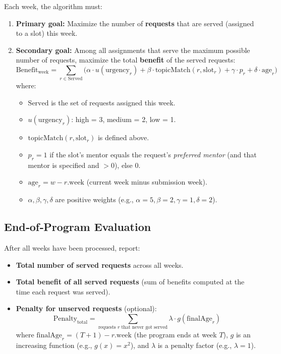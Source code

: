 \documentclass[12pt]{article}
\begin{document}
Each week, the algorithm must:

\begin{enumerate}
\item \textbf{Primary goal:} Maximize the number of \textbf{requests} that are served (assigned to a slot) this week.
\item \textbf{Secondary goal:} Among all assignments that serve the maximum possible number of requests, maximize the total \textbf{benefit} of the served requests:
\[
\text{Benefit}_{\text{week}} = \sum_{r \in \text{Served}} \Big( \alpha \cdot u(\text{urgency}_r) + \beta \cdot \text{topicMatch}(r, \text{slot}_r) + \gamma \cdot p_r + \delta \cdot \text{age}_r \Big)
\]
where:
\begin{itemize}
\item $\text{Served}$ is the set of requests assigned this week.
\item $u(\text{urgency}_r)$: high = 3, medium = 2, low = 1.
\item $\text{topicMatch}(r, \text{slot}_r)$ is defined above.
\item $p_r = 1$ if the slot’s mentor equals the request’s \textit{preferred mentor} (and that mentor is specified and $>0$), else 0.
\item $\text{age}_r = w - r.\text{week}$ (current week minus submission week).
\item $\alpha, \beta, \gamma, \delta$ are positive weights (e.g., $\alpha=5, \beta=2, \gamma=1, \delta=2$).
\end{itemize}
\end{enumerate}

\subsection*{End‑of‑Program Evaluation}

After all weeks have been processed, report:

\begin{itemize}
\item \textbf{Total number of served requests} across all weeks.
\item \textbf{Total benefit of all served requests} (sum of benefits computed at the time each request was served).
\item \textbf{Penalty for unserved requests} (optional):
\[
\text{Penalty}_{\text{total}} = \sum_{\text{requests } r \text{ that never got served}} \lambda \cdot g(\text{finalAge}_r)
\]
where $\text{finalAge}_r = (T+1) - r.\text{week}$ (the program ends at week $T$), $g$ is an increasing function (e.g., $g(x)=x^2$), and $\lambda$ is a penalty factor (e.g., $\lambda=1$).
\end{itemize}
\end{document}
